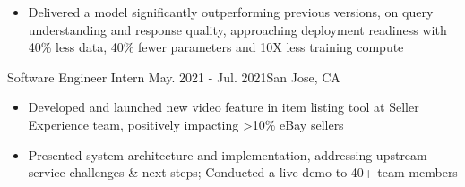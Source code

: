 \begin{itemize}
    \item Delivered a model significantly
    outperforming previous versions,
    on query understanding and response quality,
    approaching deployment readiness
    with 40\% less data, 40\% fewer parameters and 10X less training compute

\end{itemize}
\dividerSmall


    {Software Engineer Intern}
    {May. 2021 - Jul. 2021}{San Jose, CA}
\begin{itemize}

    \item Developed and launched new video feature in item listing tool at Seller Experience team, positively impacting >10\% eBay sellers

    \item Presented system architecture and implementation, addressing upstream service challenges \& next steps;
    Conducted a live demo to 40+ team members \hspace{-0.5em}
\end{itemize}
\dividerSmall


